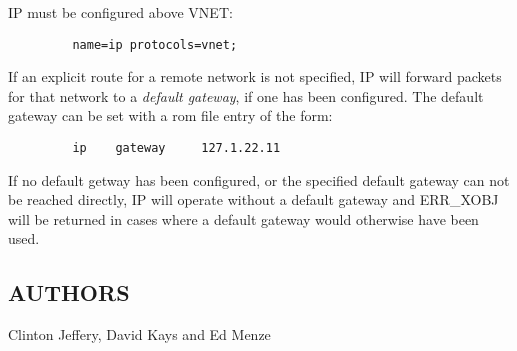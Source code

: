 IP must be configured above VNET:

\begin{verbatim}
         name=ip protocols=vnet;
\end{verbatim}

\medskip

If an explicit route for a remote network is not specified, 
IP will forward packets for that network to a {\em default gateway},
if one has been configured.
The default gateway can be set with a rom file entry of the
form:
\begin{verbatim}
         ip    gateway     127.1.22.11
\end{verbatim}

If no default getway has been configured, or the specified default
gateway can not be reached directly, IP will operate without a default
gateway and ERR\_XOBJ will be returned in cases where a default
gateway would otherwise have been used.

\subsection*{AUTHORS}

\noindent Clinton Jeffery, David Kays and Ed Menze
